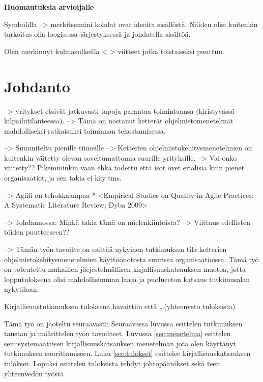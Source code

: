 
\textbf{Huomautuksia arvioijalle}

Symbolilla --> merkitsemäni kohdat ovat ideoita sisällöstä. Näiden olisi
kuitenkin tarkoitus olla loogisessa järjestyksessä ja johdatella sisältöä.

Olen merkinnyt kulmasulkeilla < > viitteet jotka toistaiseksi puuttuu.

\section{Johdanto}

--> yritykset etsivät jatkuvasti tapoja parantaa toimintaansa (kiristyvässä
kilpailutilanteessa). --> Tämä on nostanut ketterät ohjelmistomenetelmät
mahdolliseksi ratkaisuksi toiminnan tehostamisessa.

--> Suunniteltu pienille tiimeille --> Ketterien ohjelmistokehitysmenetelmien on
kuitenkin väitetty olevan soveltumattomia suurille yrityksille. --> Vai onko
väitetty?? Pikemminkin vaan ehkä todettu että isot ovet erialisia kuin pienet
organisaatiot, ja sen takia ei käy tms.

--> Agiili on tehokkaampaa
  * <Empirical Studies on Quality in Agile Practices: A Systematic Literature Review; Dyba 2009>

--> Johdannossa: Minkä takia tämä on mielenkiintoista? 
--> Viittaus edellisten töiden puutteeseen??

--> Tämän työn tavoitte on esittää nykyinen tutkimuksen tila ketterien
ohjelmistokehitysmenetelmien käyttöönotosta suurissa organisaatioissa. Tämä työ
on toteutettu mukaillen jäejestelmällisen kirjallisuuskatsauksen muotoa, jotta
lopputuloksena olisi mahdollisimman laaja ja puolueeton katsaus tutkimusalan
nykytilaan.

Kirjallisuustutkimuksen tuloksena havaittiin että \ldots (yhteenveto tuloksista)


Tämä työ on jaoteltu seuraavasti:
Seuraavassa luvussa esittelen tutkimuksen taustan ja määrittelen työn
tavoitteet. Luvussa \ref{sec:menetelma} esittelen semisystemaattisen
kirjallisuuskatsauksen menetelmän jota olen käyttänyt tutkimuksen
suorittamiseen. Luku \ref{sec:tulokset} esittelee kirjallisuuskatsauksen
tulokset. Lopuksi esittelen tuloksista tehdyt johtopäätökset sekä teen
yhteenvedon työstä.



